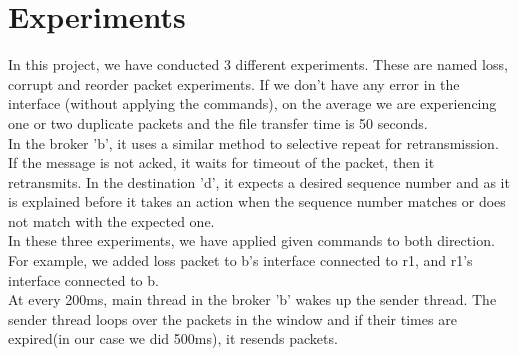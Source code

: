 \documentclass[12pt,journal,compsoc]{IEEEtran}
\begin{document}
\section{Experiments}
In this project, we have conducted 3 different experiments. These are named loss, corrupt and reorder packet experiments. If we don't have any error in the interface (without applying the commands), on the average we are experiencing one or two duplicate packets and the file transfer time is 50 seconds.\\
In the broker 'b', it uses a similar method to selective repeat for retransmission. If the message is not acked, it waits for timeout of the packet, then it retransmits. In the destination 'd', it expects a desired sequence number and as it is explained before it takes an action when the sequence number matches or does not match with the expected one.\\
In these three experiments, we have applied given commands to both direction. For example, we added loss packet to b's interface connected to r1, and r1's interface connected to b.\\
At every 200ms, main thread in the broker 'b' wakes up the sender thread. The sender thread loops over the packets in the window and if their times are expired(in our case we did 500ms), it resends packets.\\
\end{document}
